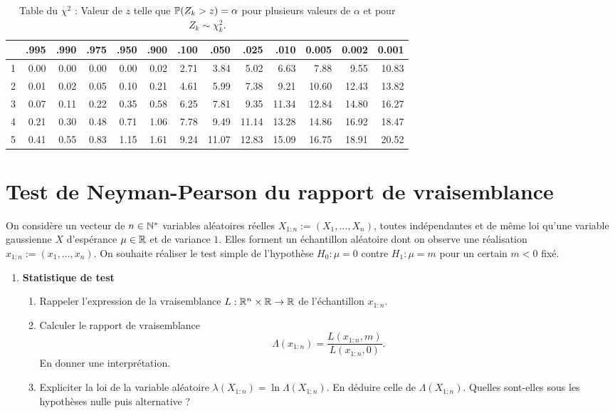 \documentclass[french,11pt]{article}
\begin{document}
\begin{table}[h]
  \centering
  \begin{tabular}{|r|r|r|r|r|r|r|r|r|r|r|r|r|} \hline
      & .995 & .990 & .975 & .950 & .900 & .100 & .050  & .025  & .010 & 0.005 & 0.002 & 0.001 \\ \hline
    1 & 0.00 & 0.00 & 0.00 & 0.00 & 0.02 & 2.71 & 3.84  & 5.02  & 6.63 & 7.88 & 9.55 & 10.83 \\ \hline
    2 & 0.01 & 0.02 & 0.05 & 0.10 & 0.21 & 4.61 & 5.99  & 7.38  & 9.21 & 10.60 & 12.43 & 13.82 \\ \hline
    3 & 0.07 & 0.11 & 0.22 & 0.35 & 0.58 & 6.25 & 7.81  & 9.35  &  11.34 & 12.84 & 14.80 & 16.27 \\ \hline
    4 & 0.21 & 0.30 & 0.48 & 0.71 & 1.06 & 7.78 & 9.49  & 11.14 &  13.28 & 14.86 & 16.92 & 18.47 \\ \hline
    5 & 0.41 & 0.55 & 0.83 & 1.15 & 1.61 & 9.24 & 11.07 & 12.83 &  15.09 & 16.75 & 18.91 & 20.52 \\ \hline
  \end{tabular}
  \caption{Table du $\chi^2$ : Valeur de $z$ telle que $\mathbb{P}(Z_k > z) = \alpha$ pour 
    plusieurs valeurs de $\alpha$ et pour $Z_k \sim \chi^2_k$.}
  \label{tab:chi2}
\end{table}

\vspace*{2em}

\section{Test de Neyman-Pearson du rapport de vraisemblance}

On considère un vecteur de $n \in \mathbb{N}^\ast$ variables aléatoires réelles $X_{1:n} := (X_1,\dots,X_n)$, toutes indépendantes et de même loi qu'une variable gaussienne $X$ d'espérance $\mu \in \mathbb{R}$ et de variance $1$. Elles forment un échantillon aléatoire dont on observe une réalisation $x_{1:n} := (x_1,\dots,x_n)$. On souhaite réaliser le test simple de l'hypothèse $H_0 : \mu = 0$ contre $H_1 : \mu = m$ pour un certain $m < 0$ fixé.

\begin{enumerate}
	\item \textbf{Statistique de test}
	\begin{enumerate}
		\item Rappeler l'expression de la vraisemblance $L : \mathbb{R}^n \times \mathbb{R} \to \mathbb{R}$ de l'échantillon $x_{1:n}$.
		\item Calculer le rapport de vraisemblance $$\Lambda(x_{1:n}) = \dfrac{L(x_{1:n} , m)}{L(x_{1:n}, 0)}.$$ En donner une interprétation.
		\item Expliciter la loi de la variable aléatoire $\lambda(X_{1:n}) = \ln \Lambda(X_{1:n})$. En déduire celle de $\Lambda(X_{1:n})$. Quelles sont-elles sous les hypothèses nulle puis alternative ?
	\end{enumerate}
\end{enumerate}
\end{document}
